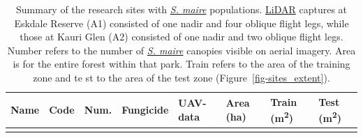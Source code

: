 \documentclass[
]{scrreprt}
\begin{document}
\begin{longtable}[]{@{}
  >{\raggedright\arraybackslash}p{}
  >{\raggedright\arraybackslash}p{}
  >{\raggedright\arraybackslash}p{}
  >{\raggedright\arraybackslash}p{}
  >{\raggedright\arraybackslash}p{}
  >{\raggedright\arraybackslash}p{}
  >{\raggedright\arraybackslash}p{}
  >{\raggedright\arraybackslash}p{}@{}}
\caption{Summary of the research sites with
\hyperref[acronyms_SM]{\emph{S. maire}} populations.
\hyperref[acronyms_LiDAR]{LiDAR} captures at Eskdale Reserve (A1)
consisted of one nadir and four oblique flight legs, while those at
Kauri Glen (A2) consisted of one nadir and two oblique flight legs.
Number refers to the number of \hyperref[acronyms_SM]{\emph{S. maire}}
canopies visible on aerial imagery. Area is for the entire forest within
that park. Train refers to the area of the training zone and te st to
the area of the test zone
(Figure~\ref{fig-sites_extent}).}\label{tbl-overview}\tabularnewline
\toprule\noalign{}
\begin{minipage}[b]{\linewidth}\raggedright
Name
\end{minipage} & \begin{minipage}[b]{\linewidth}\raggedright
Code
\end{minipage} & \begin{minipage}[b]{\linewidth}\raggedright
Num.
\end{minipage} & \begin{minipage}[b]{\linewidth}\raggedright
Fungicide
\end{minipage} & \begin{minipage}[b]{\linewidth}\raggedright
UAV-data
\end{minipage} & \begin{minipage}[b]{\linewidth}\raggedright
Area (ha)
\end{minipage} & \begin{minipage}[b]{\linewidth}\raggedright
Train (m\textsuperscript{2})
\end{minipage} & \begin{minipage}[b]{\linewidth}\raggedright
Test (m\textsuperscript{2})
\end{minipage} \\
\midrule\noalign{}

\end{longtable}
\end{document}
